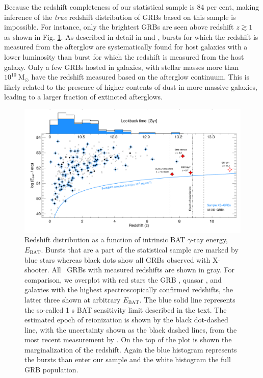 \documentclass{aa}    %
\begin{document}
Because the redshift completeness of our statistical sample is 84 per cent,
making inference of the \textit{true} redshift distribution of GRBs based on
this sample is impossible. %
For instance, only the brightest GRBs are seen above redshift $z \gtrsim 1$ as
shown in Fig. \ref{fig:z}. As described in detail in \citet{Hjorth2012} and
\citet{Perley2016b}, bursts for which the redshift is measured from the
afterglow are systematically found for host galaxies with a lower luminosity
than burst for which the redshift is measured from the host galaxy. Only a few
GRBs hosted in galaxies, with stellar masses more than
$10^{10}~\mathrm{M}_\odot$ have the redshift measured based on the afterglow
continuum. This is likely related to the presence of higher contents of dust in
more massive galaxies, leading to a larger fraction of extincted afterglows.



\begin{figure}[!ht]
	\centering \includegraphics[width=16cm]{figures/XSGRB_redshift.pdf}
\caption{Redshift distribution as a function of intrinsic BAT $\gamma$-ray
	energy, $E_{\mathrm{BAT}}$. Bursts that are a part of the statistical sample
	are marked by blue stars whereas black dots show all GRBs observed with
	X-shooter. All \swift~GRBs with measured redshifts are shown in gray. For
	comparison, we overplot with red stars the GRB \citep{Tanvir2009b,
		Salvaterra2009a}, quasar \citep{Banados2017}, and galaxies \citep{Zitrin2015,
		Oesch2016} with the highest spectroscopically confirmed redshifts, the latter
	three shown at arbitrary $E_{\mathrm{BAT}}$. The blue solid line represents the
	so-called 1 s BAT sensitivity limit described in the text. The estimated epoch
	of reionization is shown by the black dot-dashed line, with the uncertainty
	shown as the black dashed lines, from the most recent measurement by
	\citet{Planck2015}. On the top of the plot is shown the marginalization of the
	redshift. Again the blue histogram represents the bursts than enter our sample
	and the white histogram the full GRB population. } \label{fig:z}
\end{figure}
\end{document}
